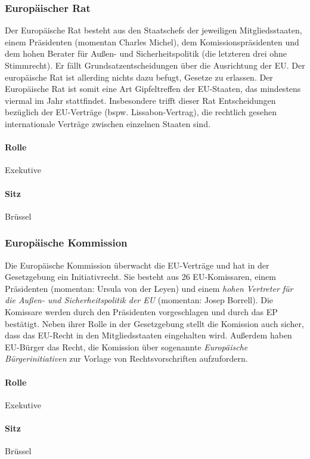 \documentclass{article}
\begin{document}
	\subsubsection{Europäischer Rat}
	Der Europäische Rat besteht aus den Staatschefs der jeweiligen Mitgliedsstaaten, einem Präsidenten (momentan Charles Michel), dem Komissionspräsidenten und dem hohen Berater für Außen- und Sicherheitspolitik (die letzteren drei ohne Stimmrecht). Er fällt Grundsatzentscheidungen über die Ausrichtung der EU. Der europäische Rat ist allerding nichts dazu befugt, Gesetze zu erlassen. Der Europäische Rat ist somit eine Art Gipfeltreffen der EU-Staaten, das mindestens viermal im Jahr stattfindet. Insbesondere trifft dieser Rat Entscheidungen bezüglich der EU-Verträge (bspw. Lissabon-Vertrag), die rechtlich gesehen internationale Verträge zwischen einzelnen Staaten sind.

	\paragraph{Rolle}
	Exekutive

	\paragraph{Sitz}
	Brüssel

	\subsubsection{Europäische Kommission}
	Die Europäische Kommission überwacht die EU-Verträge und hat in der Gesetzgebung ein Initiativrecht. Sie besteht aus 26 EU-Komissaren, einem Präsidenten (momentan: Ursula von der Leyen) und einem \textit{hohen Vertreter für die Außen- und Sicherheitspolitik der EU} (momentan: Josep Borrell). Die Komissare werden durch den Präsidenten vorgeschlagen und durch das EP bestätigt. Neben ihrer Rolle in der Gesetzgebung stellt die Komission auch sicher, dass das EU-Recht in den Mitgliedsstaaten eingehalten wird. Außerdem haben EU-Bürger das Recht, die Komission über sogenannte \textit{Europäische Bürgerinitiativen} zur Vorlage von Rechtsvorschriften aufzufordern.

	\paragraph{Rolle}
	Exekutive

	\paragraph{Sitz}
	Brüssel
\end{document}

